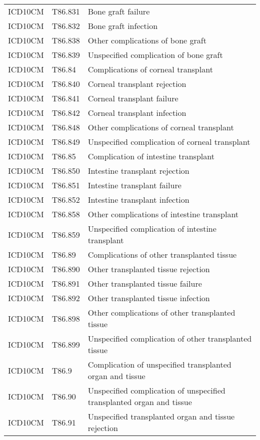 \begin{longtable}{p{}p{}p{}}
  ICD10CM & T86.831 & Bone graft failure \\ 
  ICD10CM & T86.832 & Bone graft infection \\ 
  ICD10CM & T86.838 & Other complications of bone graft \\ 
  ICD10CM & T86.839 & Unspecified complication of bone graft \\ 
  ICD10CM & T86.84 & Complications of corneal transplant \\ 
  ICD10CM & T86.840 & Corneal transplant rejection \\ 
  ICD10CM & T86.841 & Corneal transplant failure \\ 
  ICD10CM & T86.842 & Corneal transplant infection \\ 
  ICD10CM & T86.848 & Other complications of corneal transplant \\ 
  ICD10CM & T86.849 & Unspecified complication of corneal transplant \\ 
  ICD10CM & T86.85 & Complication of intestine transplant \\ 
  ICD10CM & T86.850 & Intestine transplant rejection \\ 
  ICD10CM & T86.851 & Intestine transplant failure \\ 
  ICD10CM & T86.852 & Intestine transplant infection \\ 
  ICD10CM & T86.858 & Other complications of intestine transplant \\ 
  ICD10CM & T86.859 & Unspecified complication of intestine transplant \\ 
  ICD10CM & T86.89 & Complications of other transplanted tissue \\ 
  ICD10CM & T86.890 & Other transplanted tissue rejection \\ 
  ICD10CM & T86.891 & Other transplanted tissue failure \\ 
  ICD10CM & T86.892 & Other transplanted tissue infection \\ 
  ICD10CM & T86.898 & Other complications of other transplanted tissue \\ 
  ICD10CM & T86.899 & Unspecified complication of other transplanted tissue \\ 
  ICD10CM & T86.9 & Complication of unspecified transplanted organ and tissue \\ 
  ICD10CM & T86.90 & Unspecified complication of unspecified transplanted organ and tissue \\ 
  ICD10CM & T86.91 & Unspecified transplanted organ and tissue rejection \\ 

\end{longtable}
